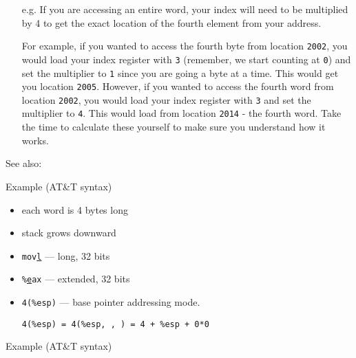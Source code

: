 \begin{itemize}
\item[e.g.] If you are accessing an entire word, your index will need to be multiplied by
  4 to get the exact location of the fourth element from your address.

  For example, if you wanted to access the fourth byte from location \texttt{2002}, you
  would load your index register with \texttt{3} (remember, we start counting at
  \texttt{0}) and set the multiplier to \texttt{1} since you are going a byte at a
  time. This would get you location \texttt{2005}. However, if you wanted to access the
  fourth word from location \texttt{2002}, you would load your index register with
  \texttt{3} and set the multiplier to \texttt{4}. This would load from location
  \texttt{2014} - the fourth word. Take the time to calculate these yourself to make sure
  you understand how it works.
\end{itemize}

See also: 

\begin{frame}
  \begin{block}{Example \scriptsize{(AT\&T syntax)}}
    \begin{center}
    \end{center}
  \end{block}
  \begin{itemize}
  \item each word is 4 bytes long
  \item stack grows downward
  \item \texttt{mov\underline{l}} --- long, 32 bits
  \item \texttt{\%\underline{e}ax} --- extended, 32 bits
  \end{itemize}
\end{frame}

\begin{itemize}
\item \texttt{4(\%esp)} --- base pointer addressing mode.
  \begin{center}
    \texttt{4(\%esp) = 4(\%esp, , ) = 4 + \%esp + 0*0}
  \end{center}
\end{itemize}

\begin{frame}
  \begin{block}{Example \scriptsize{(AT\&T syntax)}}
    \mode<beamer>{ \texttt{[image: asm]} }
  \end{block}
\end{frame}

